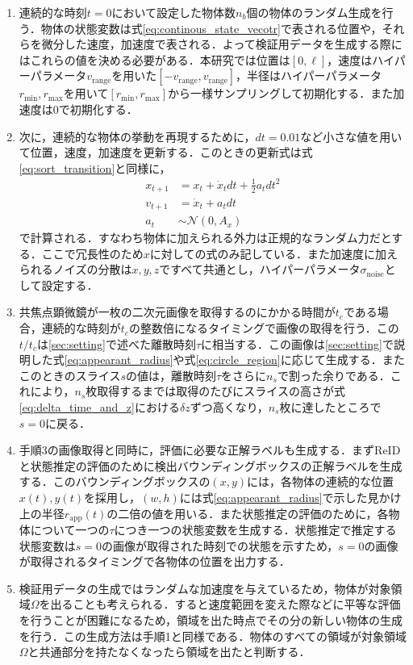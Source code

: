 \begin{enumerate}[label=手順\arabic*]
    \item 連続的な時刻$t=0$において設定した物体数$n_b$個の物体のランダム生成を行う．物体の状態変数は式\ref{eq:continous_state_vecotr}で表される位置や，それらを微分した速度，加速度で表される．よって検証用データを生成する際にはこれらの値を決める必要がある．本研究では位置は$[0, \ell]$，速度はハイパーパラメータ$v_{\text{range}}$を用いた$[-v_{\text{range}}, v_{\text{range}}]$，半径はハイパーパラメータ$r_{\text{min}}, r_{\text{max}}$を用いて$[r_{\text{min}}, r_{\text{max}}]$から一様サンプリングして初期化する．また加速度は$0$で初期化する．
    \item 次に，連続的な物体の挙動を再現するために，$dt=0.01$など小さな値を用いて位置，速度，加速度を更新する．このときの更新式は式\ref{eq:sort_transition}と同様に，
    \begin{equation}
        \label{eq:transition}
        \begin{aligned}
            x_{t+1} &= x_t + \dot{x}_t dt + \frac{1}{2} a_t dt^2
            \\v_{t+1} &= \dot{x}_t + a_t dt
            \\a_t &\sim \mathcal{N}(0, A_x)
        \end{aligned}
    \end{equation}
    で計算される．すなわち物体に加えられる外力は正規的なランダム力だとする．ここで冗長性のため$x$に対しての式のみ記している．また加速度に加えられるノイズの分散は$x, y, z$ですべて共通とし，ハイパーパラメータ$\sigma_{\text{noise}}$として設定する．
    \item 共焦点顕微鏡が一枚の二次元画像を取得するのにかかる時間が$t_c$である場合，連続的な時刻が$t_c$の整数倍になるタイミングで画像の取得を行う．この$t / t_c$は\ref{sec:setting}で述べた離散時刻$\tau$に相当する．この画像は\ref{sec:setting}で説明した式\ref{eq:appearant_radius}や式\ref{eq:circle_region}に応じて生成する．またこのときのスライス$s$の値は，離散時刻$\tau$をさらに$n_s$で割った余りである．これにより，$n_s$枚取得するまでは取得のたびにスライスの高さが式\ref{eq:delta_time_and_z}における$\delta z$ずつ高くなり，$n_s$枚に達したところで$s = 0$に戻る．
    \item 手順3の画像取得と同時に，評価に必要な正解ラベルも生成する．まずReIDと状態推定の評価のために検出バウンディングボックスの正解ラベルを生成する．このバウンディングボックスの$(x, y)$には，各物体の連続的な位置$x(t), y(t)$を採用し，$(w, h)$には式\ref{eq:appearant_radius}で示した見かけ上の半径$r_{\text{app}}(t)$の二倍の値を用いる．また状態推定の評価のために，各物体について一つの$\tau$につき一つの状態変数を生成する．状態推定で推定する状態変数は$s = 0$の画像が取得された時刻での状態を示すため，$s = 0$の画像が取得されるタイミングで各物体の位置を出力する．
    \item 検証用データの生成ではランダムな加速度を与えているため，物体が対象領域$\Omega$を出ることも考えられる．すると速度範囲を変えた際などに平等な評価を行うことが困難になるため，領域を出た時点でその分の新しい物体の生成を行う．この生成方法は手順1と同様である．物体のすべての領域が対象領域$\Omega$と共通部分を持たなくなったら領域を出たと判断する．
\end{enumerate}

